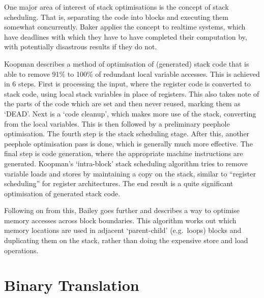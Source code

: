 One major area of interest of stack optimisations is the concept of stack
scheduling. That is, separating the code into blocks and executing them somewhat
concurrently. Baker applies the concept to realtime systems, which have
deadlines with which they have to have completed their computation by, with
potentially disastrous results if they do not.\cite{Baker1991Stack}

Koopman describes a method of optimisation of (generated) stack code that is
able to remove 91\% to 100\% of redundant local variable accesses. This is
achieved in 6 steps. First is processing the input, where the register code is
converted to stack code, using local stack variables in place of registers. This
also takes note of the parts of the code which are set and then never reused,
marking them as `DEAD'. Next is a `code cleanup', which makes more use of the
stack, converting from the local variables. This is then followed by a
preliminary peephole optimisation. The fourth step is the stack scheduling
stage. After this, another peephole optimisation pass is done, which is
generally much more effective. The final step is code generation, where the
appropriate machine instructions are generated. Koopman's `intra-block' stack
scheduling algorithm tries to remove variable loads and stores by maintaining a
copy on the stack, similar to ``register scheduling'' for register
architectures. The end result is a quite significant optimisation of generated
stack code.\cite{Koopman1995Preliminary}

Following on from this, Bailey goes further and describes a way to optimise
memory accesses across block boundaries. This algorithm works out which memory
locations are used in adjacent `parent-child' (e.g.\ loops) blocks and
duplicating them on the stack, rather than doing the expensive store and load
operations.\cite{Bailey2000Inter}


\section{Binary Translation}

